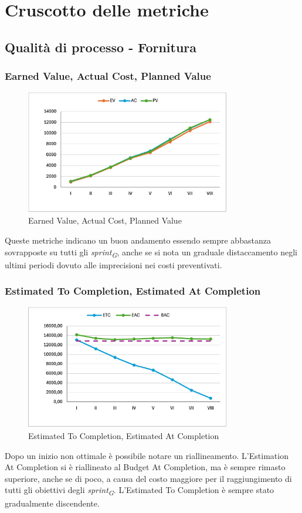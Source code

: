 \section{Cruscotto delle metriche}
\subsection{Qualità di processo - Fornitura}
\subsubsection{Earned Value, Actual Cost, Planned Value}
\begin{figure}[H]
    \centering
    \includegraphics[width=0.8\textwidth]{./images/EV-AC-PV.png}
    \caption{Earned Value, Actual Cost, Planned Value}
\end{figure}
Queste metriche indicano un buon andamento essendo sempre abbastanza sovrapposte su tutti gli \textit{sprint\textsubscript{G}}, anche se si nota un graduale distaccamento negli ultimi periodi dovuto alle imprecisioni nei costi preventivati.

\subsubsection{Estimated To Completion, Estimated At Completion}
\begin{figure}[H]
    \centering
    \includegraphics[width=0.8\textwidth]{images/ETC-EAC-BAC.png}
    \caption{Estimated To Completion, Estimated At Completion}
\end{figure}
Dopo un inizio non ottimale è possibile notare un riallineamento. L'Estimation At Completion si è riallineato al Budget At Completion, ma è sempre rimasto superiore, anche se di poco, a causa del costo maggiore per il raggiungimento di tutti gli obiettivi degli \textit{sprint\textsubscript{G}}. L'Estimated To Completion è sempre stato gradualmente discendente.

